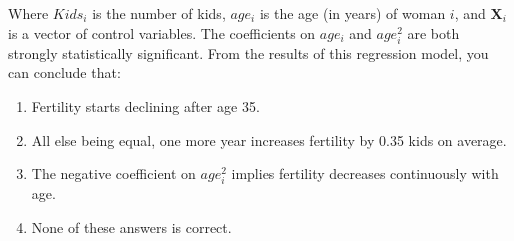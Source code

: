\documentclass{article}
\begin{document}
\begin{enumerate}
Where $Kids_i$ is the number of kids, $age_i$ is the age (in years) of woman $i$, and $\textbf{X}_{i}$ is a vector of control variables. The coefficients on $age_i$ and $age_i^2$ are both strongly statistically significant. From the results of this regression model, you can conclude that:

\begin{enumerate}[label=\alph*)]
\item {\color{blue}Fertility starts declining after age 35.}
\item All else being equal, one more year increases fertility by 0.35 kids on average.
\item The negative coefficient on  $age_i^2$ implies fertility decreases continuously with age.
\item None of these answers is correct.
\end{enumerate}\vspace{.25cm}



\end{enumerate}


\newpage
{}\\[2em]
\end{document}
